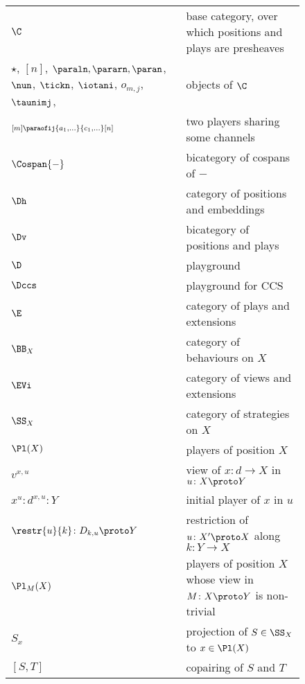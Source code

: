 \documentclass{LMCS}
\theoremstyle{plain}\newtheorem{satz}[thm]{Satz}
\begin{document}



  \begin{figure}[p]
\vspace*{-2em}    \begin{multicols}{2}
\hspace*{-4em}      \begin{tabular}{lp{.8\linewidth}}
        $\C$ & base category, over which positions and plays are presheaves \\
        \begin{minipage}[t]{.3\linewidth}
          \raggedright $\star$, $[n]$, $\paraln, \pararn, \paran$, $\nun$, $\tickn$,
          $\iotani$, $o_{m,j}$, $\taunimj$, 
        \end{minipage} & objects of $\C$ \\
        $\scriptstyle [m] \paraofij{a_1,\ldots}{c_1,\ldots} [n]$ &
        two players sharing some channels \\
        $\Cospan{-}$ & bicategory of cospans of $-$ \\
        $\Dh$ & category of positions and embeddings \\
        $\Dv$ & bicategory of positions and plays \\
        $\D$ & playground \\
$\Dccs$
& playground for CCS \\
        $\E$ & category of plays and extensions \\
        $\BB_X$ & category of behaviours on $X$ \\
        $\EVi$ & category of views and extensions \\
        $\SS_X$ & category of strategies on $X$ \\
        $\Pl(X)$ & players of position $X$ \\
        $v^{x,u}$ & view of $x \colon d \to X$ in $u \colon X \proto Y$ \\
        $x^u \colon d^{x,u} \colon Y$ & initial player of $x$ in $u$ \\
        $\restr{u}{k} \colon D_{k,u} \proto Y$ & 
        restriction of $u \colon X' \proto X$ along $k \colon Y \to X$ \\
        $\Pl_M(X)$ & players of position $X$ whose view in $M \colon X \proto Y$ is non-trivial \\
        $S_x$ & projection of $S \in \SS_X$ to $x \in \Pl(X)$ \\
        $[S,T]$ & copairing of $S$ and $T$ \\

\end{tabular}
\end{multicols}
\end{figure}
\end{document}
